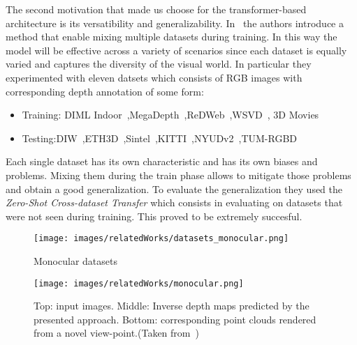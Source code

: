 The second motivation that made us choose for the transformer-based architecture is its versatibility and generalizability.
In~\cite{Ranftl2022} the authors introduce a method that enable mixing multiple datasets during training. In this way the model will be 
effective across a variety of scenarios since each dataset is equally varied and captures the diversity of the visual world.
In particular they experimented with eleven datsets which consists of RGB images with corresponding depth annotation of some form:
\begin{itemize}
    \item Training: DIML Indoor~\cite{DIML},MegaDepth~\cite{megadepth},ReDWeb~\cite{redweb},WSVD~\cite{wsvd}, 3D Movies~\cite{DIML}
    \item Testing:DIW~\cite{diw},ETH3D~\cite{eth3d},Sintel~\cite{sintel},KITTI~\cite{kitti},NYUDv2~\cite{nyudv2},TUM-RGBD~\cite{tum_rgbd}
\end{itemize}
Each single dataset has its own characteristic and has its own biases and problems. Mixing them during the train phase allows to mitigate
those problems and obtain a good generalization. To evaluate the generalization they used the \textit{Zero-Shot Cross-dataset Transfer} which
consists in evaluating on datasets that were not seen during training. This proved to be extremely succesful.


\begin{figure}
    \centering
    \texttt{[image: images/relatedWorks/datasets\_monocular.png]} 
    \caption{Monocular datasets}\label{fig:datasets_mono}
\end{figure}
\begin{figure}
    \centering
    \texttt{[image: images/relatedWorks/monocular.png]} 
    \caption{Top: input images. Middle: Inverse depth maps predicted by the presented approach. Bottom: corresponding point clouds
        rendered from a novel view-point.(Taken from~\cite{Ranftl2022})}\label{fig:mono}
\end{figure}
